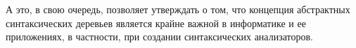 \documentclass[coursework]{SCWorks}
\begin{document}
А это, в свою очередь, позволяет утверждать о том, что концепция абстрактных 
синтаксических деревьев является крайне важной в информатике и ее приложениях, 
в частности, при создании синтаксических анализаторов.

%






\appendix
\end{document}
